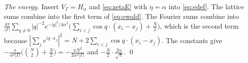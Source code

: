 \emph{The energy.} Insert $V_\Gamma=H_\alpha$ and \eqref{eq:zetaE} with $\eta=\alpha$ into \eqref{eq:edef}. The lattice sums combine into
the first term of \eqref{eq:ewald}. The Fourier sums combine into
$\frac{4\pi}{|\Gamma|}\sum_{q\ne0}|q|^{-2}e^{-|q|^2/4\alpha^2}\bigl(\sum_{i<j}\cos q\cdot(x_i-x_j)+\frac N2\bigr)$, which is the second
term because $|\sum_je^{iq\cdot x_j}|^2=N+2\sum_{i<j}\cos q\cdot(x_i-x_j)$. The constants give
$-\frac{\pi}{\alpha^2|\Gamma|}\bigl(\binom N2+\frac N2\bigr)=-\frac{\pi N^2}{2\alpha^2|\Gamma|}$ and $-\frac N2\cdot\frac{2\alpha}{\sqrt\pi}$.
\qed
